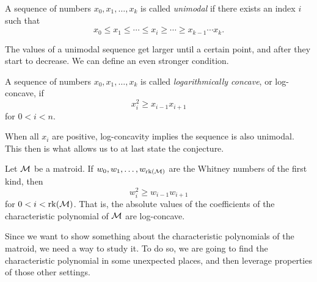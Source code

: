 \documentclass[12pt,oneside]{../../sfsuthesis}
\begin{document}
\begin{definition}[Unimodal]\th\label{def:unimodal}
    A sequence of numbers \( x_0, x_1, \dots, x_k \) is called \emph{unimodal} if there exists an index \( i \) such that
    \[
        x_0 \leq x_1 \leq \cdots \leq x_i \geq \cdots \geq x_{k-1} \cdots x_k.
    \]

\end{definition}

The values of a unimodal sequence get larger until a certain point, and after they start to decrease.
We can define an even stronger condition.

\begin{definition}\th\label{def:logConcave}
    A sequence of numbers \( x_0, x_1, \dots, x_k \) is called \emph{logarithmically concave}, or log-concave, if
    \[
        x_i^2 \geq x_{i-1} x_{i+1}
    \]
    for \( 0 < i < n \).
\end{definition}

When all \( x_i \) are positive, log-concavity implies the sequence is also unimodal.
This then is what allows us to at last state the conjecture.

\begin{theorem}\th\label{thm:HRW}
    Let \( \mathcal{M} \) be a matroid.
    If \( w_0, w_1, \dots, w_{\operatorname{rk}(\mathcal{M})} \) are the Whitney numbers of the first kind, then
    \[
        w_i^2 \geq w_{i-1}w_{i+1}
    \]
    for \( 0 < i < \operatorname{rk}(\mathcal{M}) \).
    That is, the absolute values of the coefficients of the characteristic polynomial of \( \mathcal{M} \) are log-concave.
\end{theorem}

Since we want to show something about the characteristic polynomials of the matroid, we need a way to study it.
To do so, we are going to find the characteristic polynomial in some unexpected places, and then leverage properties of those other settings.
\end{document}
